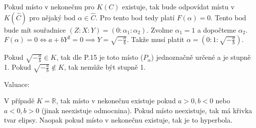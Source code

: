 \documentclass[12pt, a4paper]{article}
\begin{document}
Pokud místo v nekonečnu pro $K(C)$ existuje, tak bude odpovídat místu v $K(\hat{C})$ pro nějaký bod $\alpha \in \hat{C}$. Pro tento bod tedy platí $F(\alpha)=0$. Tento bod bude mít souřadnice $(Z:X:Y) = (0:\alpha_1:\alpha_2)$. Zvolme $\alpha_1 = 1$ a dopočteme $\alpha_2$. $F(\alpha)=0 \iff a + bY^2 = 0 \implies Y = \sqrt{-\frac{a}{b}}$. Takže musí platit $\alpha = (0:1:\sqrt{-\frac{a}{b}})$.

Pokud $\sqrt{-\frac{a}{b}} \in K$, tak dle P.15 je toto místo ($P_\alpha$) jednoznačně určené a je stupně 1. Pokud $\sqrt{-\frac{a}{b}} \notin K$, tak nemůže být stupně 1.

Valuace:

V případě $K = \mathbb{R}$, tak místo v nekonečnu existuje pokud $a > 0, b < 0$ nebo $a < 0, b > 0$ (jinak neexistuje odmocnina). Pokud místo neexistuje, tak má křivka tvar elipsy. Naopak pokud místo v nekonečnu existuje, tak je to hyperbola.
\end{document}
